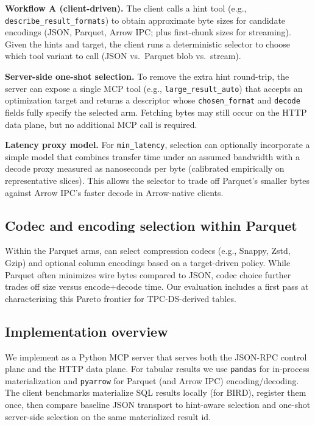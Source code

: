 \smallskip
\noindent\textbf{Workflow A (client-driven).}
The client calls a hint tool (e.g., \texttt{describe\_result\_formats}) to obtain approximate byte sizes for candidate encodings (JSON, Parquet, Arrow IPC; plus first-chunk sizes for streaming). Given the hints and target, the client runs a deterministic selector to choose which tool variant to call (JSON vs.\ Parquet blob vs.\ stream).

\smallskip
\noindent\textbf{Server-side one-shot selection.}
To remove the extra hint round-trip, the server can expose a single MCP tool (e.g., \texttt{large\_result\_auto}) that accepts an optimization target and returns a descriptor whose \texttt{chosen\_format} and \texttt{decode} fields fully specify the selected arm. Fetching bytes may still occur on the HTTP data plane, but no additional MCP call is required.

\smallskip
\noindent\textbf{Latency proxy model.}
For \texttt{min\_latency}, selection can optionally incorporate a simple model that combines transfer time under an assumed bandwidth with a decode proxy measured as nanoseconds per byte (calibrated empirically on representative slices). This allows the selector to trade off Parquet’s smaller bytes against Arrow IPC’s faster decode in Arrow-native clients.

\subsection{Codec and encoding selection within Parquet}
Within the Parquet arms, \system can select compression codecs (e.g., Snappy, Zstd, Gzip) and optional column encodings based on a target-driven policy. While Parquet often minimizes wire bytes compared to JSON, codec choice further trades off size versus encode+decode time. Our evaluation includes a first pass at characterizing this Pareto frontier for TPC-DS-derived tables.

\subsection{Implementation overview}
We implement \system as a Python MCP server that serves both the JSON-RPC control plane and the HTTP data plane. For tabular results we use \texttt{pandas} for in-process materialization and \texttt{pyarrow} for Parquet (and Arrow IPC) encoding/decoding. The client benchmarks materialize SQL results locally (for BIRD), register them once, then compare baseline JSON transport to hint-aware selection and one-shot server-side selection on the same materialized result id.